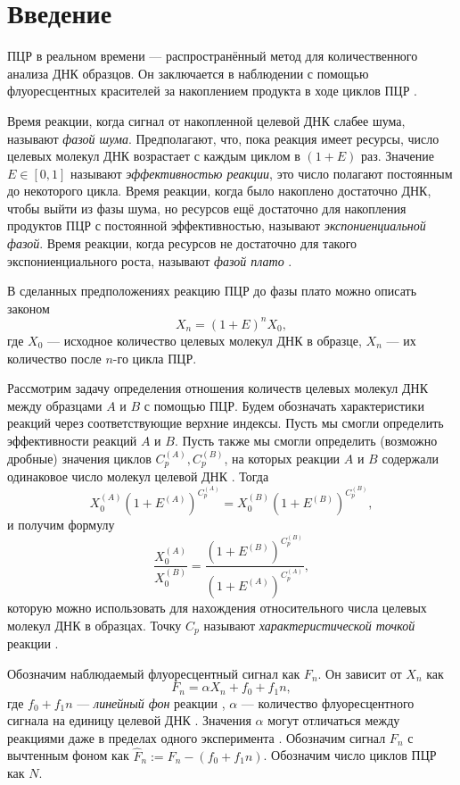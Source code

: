 
\section{Введение}

ПЦР в реальном времени --- распространённый метод для количественного анализа
ДНК образцов. Он заключается в наблюдении с помощью флуоресцентных красителей
за накоплением продукта в ходе циклов ПЦР
\cite{kubistaRealtimePolymeraseChain2006}.

Время реакции, когда сигнал от накопленной целевой ДНК слабее шума, называют
{\it фазой шума}. Предполагают, что, пока реакция имеет ресурсы, число
целевых молекул ДНК возрастает с каждым циклом в $(1+E)$ раз. Значение
$E\in[0,1]$ называют {\it эффективностью реакции}, это число полагают
постоянным до некоторого цикла. Время реакции, когда было накоплено достаточно
ДНК, чтобы выйти из фазы шума, но ресурсов ещё достаточно для накопления
продуктов ПЦР с постоянной эффективностью, называют {\it экспониенциальной
фазой}. Время реакции, когда ресурсов не достаточно для такого
экспониенциального роста, называют {\it фазой плато}
\cite{rebrikovRealtimePCRReview2006}.

В сделанных предположениях реакцию ПЦР до фазы плато можно описать законом
\[
  X_{n}=(1+E)^{n}X_0,
\]
где $X_0$ --- исходное количество целевых молекул ДНК в образце, $X_{n}$ ---
их количество после $n$-го цикла ПЦР.

Рассмотрим задачу определения отношения количеств целевых молекул ДНК между
образцами $A$ и $B$ с помощью ПЦР. Будем обозначать характеристики реакций
через соответствующие верхние индексы. Пусть мы смогли определить эффективности
реакций $A$ и $B$. Пусть также мы смогли определить (возможно дробные)
значения циклов $C_{p}^{(A)}, C_{p}^{(B)}$, на которых реакции $A$ и $B$
содержали одинаковое число молекул целевой ДНК
\cite{rasmussenQuantificationLightCycler2001}. Тогда
\[
  X_0^{(A)}(1+E^{(A)})^{C_{p}^{(A)}}=
  X_0^{(B)}(1+E^{(B)})^{C_{p}^{(B)}},
\]
и получим формулу
\[
  \frac{X_0^{(A)}}{X_0^{(B)}}=
  \frac{(1+E^{(B)})^{C_{p}^{(B)}}}{(1+E^{(A)})^{C_{p}^{(A)}}},
\]
которую можно использовать для нахождения относительного числа целевых молекул
ДНК в образцах. Точку $C_{p}$ называют {\it характеристической точкой} реакции
\cite{rebrikovPCRRealnomVremeni2009}.

Обозначим наблюдаемый флуоресцентный сигнал как $F_{n}$. Он зависит
от $X_{n}$ как
\begin{equation}\label{eq:signal}
  F_{n}=\alpha X_{n} + f_0+f_1n,
\end{equation}
где $f_0+f_1n$ --- {\it линейный фон} реакции
\cite{peccoudStatisticalEstimationsPCR1998}, $\alpha$ --- количество
флуоресцентного сигнала на единицу целевой ДНК
\cite{rebrikovRealtimePCRReview2006}. Значения $\alpha$ могут отличаться между
реакциями даже в пределах одного эксперимента
\cite{rebrikovRealtimePCRReview2006,larionovStandardCurveBased2005}. Обозначим
сигнал $F_{n}$ с вычтенным фоном как $\hat F_{n}:=F_{n}-(f_0+f_1n)$. Обозначим
число циклов ПЦР как $N$.


